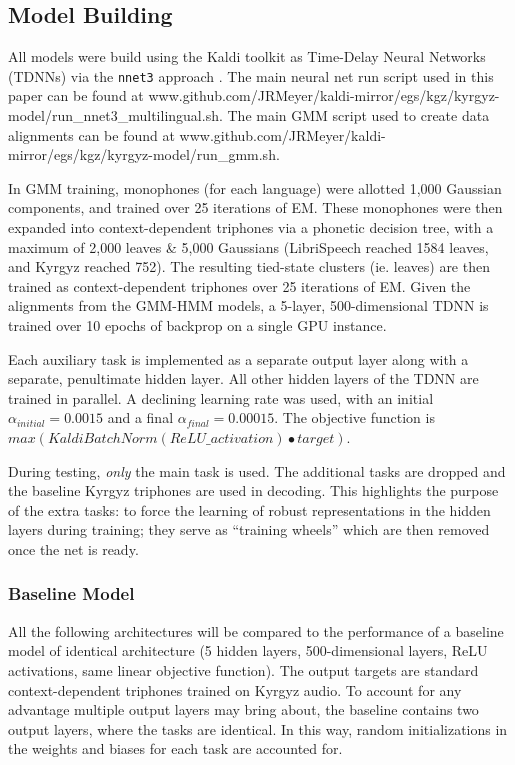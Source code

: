 \documentclass[a4paper]{article}
\begin{document}
\subsection{Model Building}

All models were build using the Kaldi toolkit as Time-Delay Neural Networks (TDNNs) via the \texttt{nnet3} approach \cite{povey2011,peddinti2015}. The main neural net run script used in this paper can be found at www.github.com/JRMeyer/kaldi-mirror/egs/kgz/kyrgyz-model/run\_nnet3\_multilingual.sh. The main GMM script used to create data alignments can be found at www.github.com/JRMeyer/kaldi-mirror/egs/kgz/kyrgyz-model/run\_gmm.sh.

In GMM training, monophones (for each language) were allotted 1,000 Gaussian components, and trained over 25 iterations of EM. These monophones were then expanded into context-dependent triphones via a phonetic decision tree, with a maximum of 2,000 leaves \& 5,000 Gaussians (LibriSpeech reached 1584 leaves, and Kyrgyz reached 752). The resulting tied-state clusters (ie. leaves) are then trained as context-dependent triphones over 25 iterations of EM. Given the alignments from the GMM-HMM models, a 5-layer, 500-dimensional TDNN is trained over 10 epochs of backprop on a single GPU instance.

Each auxiliary task is implemented as a separate output layer along with a separate, penultimate hidden layer. All other hidden layers of the TDNN are trained in parallel. A declining learning rate was used, with an initial $\alpha_{initial}=0.0015$ and a final $\alpha_{final}=0.00015$. The objective function is $max( KaldiBatchNorm(ReLU\_activation) \bullet target )$.

During testing, \textit{only} the main task is used. The additional tasks are dropped and the baseline Kyrgyz triphones are used in decoding. This highlights the purpose of the extra tasks: to force the learning of robust representations in the hidden layers during training; they serve as ``training wheels'' which are then removed once the net is ready.



\subsubsection{Baseline Model}

All the following architectures will be compared to the performance of a baseline model of identical architecture (5 hidden layers, 500-dimensional layers, ReLU activations, same linear objective function). The output targets are standard context-dependent triphones trained on Kyrgyz audio. To account for any advantage multiple output layers may bring about, the baseline contains two output layers, where the tasks are identical. In this way, random initializations in the weights and biases for each task are accounted for.
\end{document}
